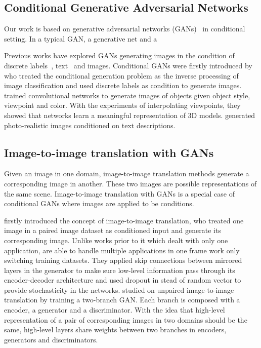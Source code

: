 \subsection{Conditional Generative Adversarial Networks}
Our work is based on generative adversarial networks (GANs)~\cite{GAN} in conditional setting. In a typical GAN, a generative net and a 

Previous works have explored GANs generating images in the condition of discrete labels~\cite{CGAN}, text~\cite{reed1, reed2} and images. 
Conditional GANs were firstly introduced by \cite{CGAN} who treated the conditional generation problem as the inverse processing of image classification and used discrete labels as condition to generate images.
%
\cite{Dosovitskiy} trained convolutional networks to generate images of objects given object style, viewpoint and color. With the experiments of interpolating viewpoints, they showed that networks learn a meaningful representation of 3D models. 
%
\cite{reed1, reed2} generated photo-realistic images conditioned on text descriptions.

\subsection{Image-to-image translation with GANs}
Given an image in one domain, image-to-image translation methods generate a corresponding image in another. These two images are possible representations of the same scene. Image-to-image translation with GANs is a special case of conditional GANs where images are applied to be conditions. 
%

\cite{pix2pix} firstly introduced the concept of image-to-image translation, who treated one image in a paired image dataset as conditioned input and generate its corresponding image. Unlike works prior to it which dealt with only one application, \cite{pix2pix} are able to handle multiple applications in one frame work only switching training datasets. They applied skip connections between mirrored layers in the generator to make sure low-level information pass through its encoder-decoder architecture and used dropout in stead of random vector to provide stochasticity in the networks.
%
\cite{unit} studied on unpaired image-to-image translation by training a two-branch GAN. Each branch is composed with a encoder, a generator and a discriminator. With the idea that high-level representation of a pair of corresponding images in two domains should be the same, high-level layers share weights between two branches in encoders, generators and discriminators. 
%

